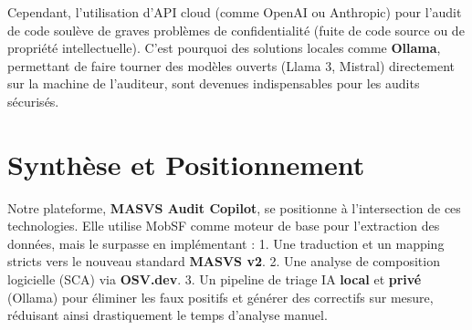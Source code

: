 Cependant, l'utilisation d'API cloud (comme OpenAI ou Anthropic) pour l'audit de code soulève de graves problèmes de confidentialité (fuite de code source ou de propriété intellectuelle). C'est pourquoi des solutions locales comme \textbf{Ollama}, permettant de faire tourner des modèles ouverts (Llama 3, Mistral) directement sur la machine de l'auditeur, sont devenues indispensables pour les audits sécurisés.

\section{Synthèse et Positionnement}
Notre plateforme, \textbf{MASVS Audit Copilot}, se positionne à l'intersection de ces technologies. Elle utilise MobSF comme moteur de base pour l'extraction des données, mais le surpasse en implémentant :
1. Une traduction et un mapping stricts vers le nouveau standard \textbf{MASVS v2}.
2. Une analyse de composition logicielle (SCA) via \textbf{OSV.dev}.
3. Un pipeline de triage IA \textbf{local} et \textbf{privé} (Ollama) pour éliminer les faux positifs et générer des correctifs sur mesure, réduisant ainsi drastiquement le temps d'analyse manuel.

\cleardoublepage
